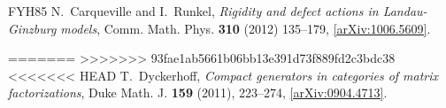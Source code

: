 \documentclass{compositio}
\theoremstyle{definition}
\numberwithin{equation}{section}
\begin{document}
\begin{thebibliography}{FYH{\etalchar{+}}85}
N.~Carqueville and I.~Runkel, \emph{Rigidity and defect actions in
  Landau-Ginzburg models}, Comm. Math. Phys. \textbf{310} (2012) 135--179, 
  \href{http://arxiv.org/abs/1006.5609}{[arXiv:1006.5609]}.

=======
%
%
>>>>>>> 93fae1ab5661b06bb13e391d73f889fd2c3bdc38
%
%
%
%
%  
<<<<<<< HEAD
T.~Dyckerhoff, \emph{Compact generators in categories of matrix factorizations},
  Duke Math. J. \textbf{159} (2011), 223--274,
  \href{http://arxiv.org/abs/0904.4713}{[arXiv:0904.4713]}.


\end{thebibliography}
\end{document}
